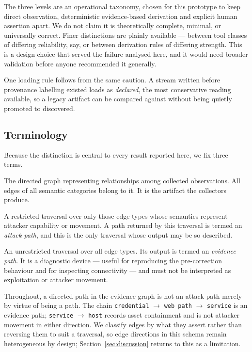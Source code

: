 \documentclass[11pt,a4paper]{article}
\begin{document}
The three levels are an operational taxonomy, chosen for this prototype to keep direct observation, deterministic evidence-based derivation and explicit human assertion apart. We do not claim it is theoretically complete, minimal, or universally correct. Finer distinctions are plainly available --- between tool classes of differing reliability, say, or between derivation rules of differing strength. This is a design choice that served the failure analysed here, and it would need broader validation before anyone recommended it generally.

One loading rule follows from the same caution. A stream written before provenance labelling existed loads as \emph{declared}, the most conservative reading available, so a legacy artifact can be compared against without being quietly promoted to discovered.

\subsection{Terminology}\label{sec:terminology}
Because the distinction is central to every result reported here, we fix three terms.

\begin{description}[leftmargin=*,style=nextline]
\item[Evidence graph] The directed graph representing relationships among collected observations. All edges of all semantic categories belong to it. It is the artifact the collectors produce.
\item[Attack (capability) traversal] A restricted traversal over only those edge types whose semantics represent attacker capability or movement. A path returned by this traversal is termed an \emph{attack path}, and this is the only traversal whose output may be so described.
\item[Evidence traversal] An unrestricted traversal over all edge types. Its output is termed an \emph{evidence path}. It is a diagnostic device --- useful for reproducing the pre-correction behaviour and for inspecting connectivity --- and must not be interpreted as exploitation or attacker movement.
\end{description}

Throughout, a directed path in the evidence graph is not an attack path merely by virtue of being a path. The chain \texttt{credential} $\rightarrow$ \texttt{web path} $\rightarrow$ \texttt{service} is an evidence path; \texttt{service} $\rightarrow$ \texttt{host} records asset containment and is not attacker movement in either direction. We classify edges by what they assert rather than reversing them to suit a traversal, so edge directions in this schema remain heterogeneous by design; Section~\ref{sec:discussion} returns to this as a limitation.
\end{document}
